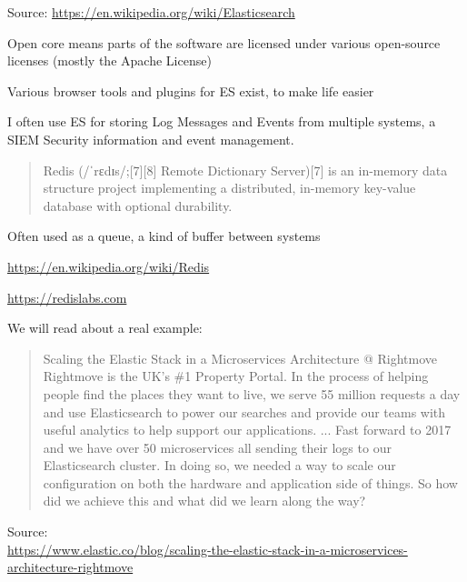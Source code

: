 \documentclass[Screen16to9,17pt]{foils}
\begin{document}
Source: \url{https://en.wikipedia.org/wiki/Elasticsearch}

\begin{list2}
\item Open core means parts of the software are licensed under various open-source licenses (mostly the Apache License)
\item Various browser tools and plugins for ES exist, to make life easier
\item I often use ES for storing Log Messages and Events from multiple systems, a SIEM Security information and event management.
\end{list2}


\begin{quote}
Redis (/ˈrɛdɪs/;[7][8] Remote Dictionary Server)[7] is an in-memory data structure
project implementing a distributed, in-memory key-value database with optional durability.
\end{quote}

\begin{list2}
\item Often used as a queue, a kind of buffer between systems
\item \url{https://en.wikipedia.org/wiki/Redis}
\item \url{https://redislabs.com}
\end{list2}



We will read about a real example:

\begin{quote}
Scaling the Elastic Stack in a Microservices Architecture @ Rightmove\\
Rightmove is the UK's \#1 Property Portal. In the process of helping people find the places they want to live, we serve 55 million requests a day and use Elasticsearch to power our searches and provide our teams with useful analytics to help support our applications.
...
Fast forward to 2017 and we have over 50 microservices all sending their logs to our Elasticsearch cluster. In doing so, we needed a way to scale our configuration on both the hardware and application side of things. So how did we achieve this and what did we learn along the way?
\end{quote}
Source:\\
{\footnotesize\url{https://www.elastic.co/blog/scaling-the-elastic-stack-in-a-microservices-architecture-rightmove}}
\end{document}
